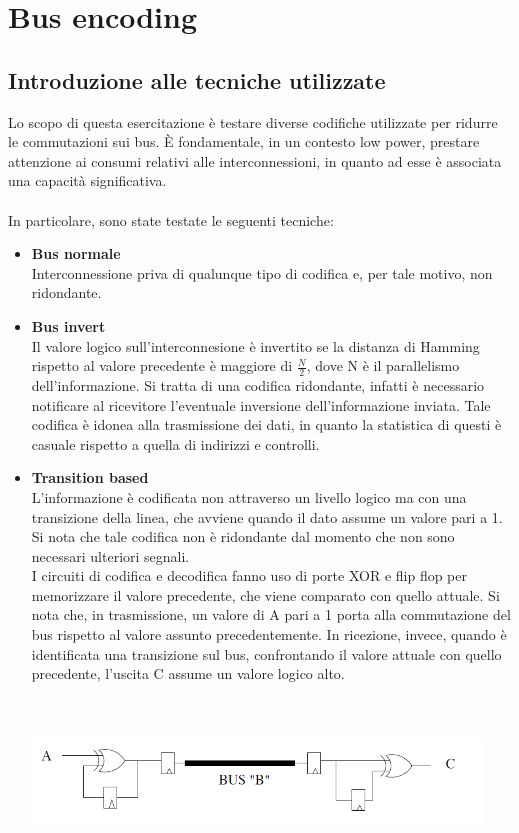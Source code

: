 \documentclass[11pt,  english, makeidx, a4paper, titlepage, oneside]{book}
\begin{document}
\chapter{Bus encoding}
\section{Introduzione alle tecniche utilizzate}
Lo scopo di questa esercitazione è testare diverse codifiche utilizzate per ridurre le commutazioni sui bus. È fondamentale, in un contesto low power, prestare attenzione ai consumi relativi alle interconnessioni, in quanto ad esse è associata una capacità significativa.
\\\\
In particolare, sono state testate le seguenti tecniche:
\begin{itemize}
\item \textbf{Bus normale}
\\
Interconnessione priva di qualunque tipo di codifica e, per tale motivo, non ridondante.
\item \textbf{Bus invert}
\\
Il valore logico sull'interconnesione è invertito se la distanza di Hamming rispetto al valore precedente è maggiore di $\frac{N}{2}$, dove N è il parallelismo dell'informazione. Si tratta di una codifica ridondante, infatti è necessario notificare al ricevitore l'eventuale inversione dell'informazione inviata.
Tale codifica è idonea alla trasmissione dei dati, in quanto la statistica di questi è casuale rispetto a quella di indirizzi e controlli.
\item \textbf{Transition based}
\\
L'informazione è codificata non attraverso un livello logico ma con una transizione della linea, che avviene quando il dato assume un valore pari a 1. Si nota che tale codifica non è ridondante dal momento che non sono necessari ulteriori segnali.
\\
I circuiti di codifica e decodifica fanno uso di porte XOR e flip flop per memorizzare il valore precedente, che viene comparato con quello attuale. Si nota che, in trasmissione, un valore di A pari a 1 porta alla commutazione del bus rispetto al valore assunto precedentemente. In ricezione, invece, quando è identificata una transizione sul bus, confrontando il valore attuale con quello precedente, l'uscita C assume un valore logico alto.
\\\\\\
\centerline{\includegraphics[width=12cm]{./img/Lab_4/tran_based.png}}

\end{itemize}
\end{document}
